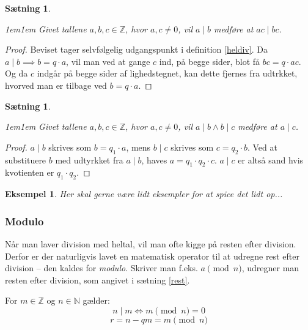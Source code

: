 \documentclass[a4paper, 12pt]{article}
\theoremstyle{break}
\newtheorem{eks}[definition]{Eksempel}
\theoremstyle{breakline}
\newtheorem{sentence}[definition]{Sætning}
\newenvironment{sent}
    {\begin{sentence}\mbox{}\begin{adjustwidth}{1em}{1em}}
    {\end{adjustwidth}\par\noindent\hrulefill\end{sentence}}
\begin{document}
    \begin{sent}
        Givet tallene \(a, b, c \in \mathbb{Z}\), hvor \(a, c \neq 0\), vil \(a \mid b\) medføre at \(a c \mid b c\).
    \end{sent}

    \begin{proof}
        Beviset tager selvfølgelig udgangspunkt i definition \ref{heldiv}.
        Da \(a \mid b \implies b = q \cdot a\), vil man ved at gange \(c\) ind, på begge sider, blot få \(b c = q \cdot a c\).
        Og da \(c\) indgår på begge sider af lighedstegnet, kan dette fjernes fra udtrkket, hvorved man er tilbage ved \(b = q \cdot a\).
    \end{proof}





    \begin{sent}
        Givet tallene \(a, b, c \in \mathbb{Z}\), hvor \(a, c \neq 0\), vil \(a \mid b \land b \mid c\) medføre at \(a \mid c\).
    \end{sent}

    \begin{proof}
        \(a \mid b\) skrives som \(b = q_1 \cdot a\), mens \(b \mid c\) skrives som \(c = q_2 \cdot b\). Ved at substituere \(b\) med udtyrkket fra \(a \mid b\), haves \(a = q_1 \cdot q_2 \cdot c\). \(a \mid c\) er altså sand hvis kvotienten er \(q_1 \cdot q_2\).
    \end{proof}


    \begin{eks}
        Her skal gerne være lidt eksempler for at spice det lidt op...
    \end{eks}



    \subsubsection{Modulo}
    Når man laver division med heltal, vil man ofte kigge på resten efter division.
    Derfor er der naturligvis lavet en matematisk operator til at udregne rest efter division -- den kaldes for \emph{modulo}.
    Skriver man f.eks. \(a \pmod{n}\), udregner man resten efter division, som angivet i sætning \ref{rest}.

    \begin{definition}
        For \(m \in \mathbb{Z}\) og \(n \in \mathbb{N}\) gælder:
        \[n \mid m \iff m \pmod{n} = 0\]
        \[r = n - q m = m \pmod{n}\]\cite[72]{krypto}
    \end{definition}
\end{document}
